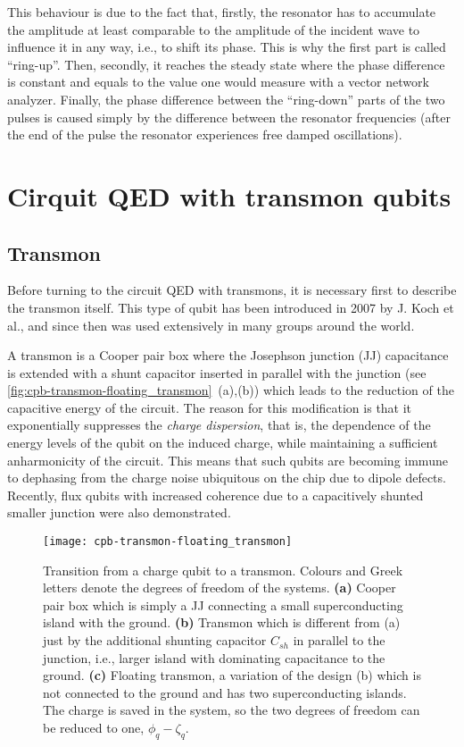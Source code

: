 This behaviour is due to the fact that, firstly, the resonator has to accumulate the amplitude at least comparable to the amplitude of the incident wave to influence it in any way, i.e., to shift its phase. This is why the first part is called ``ring-up''. Then, secondly, it reaches the steady state where the phase difference is constant and equals to the value one would measure with a vector network analyzer. Finally, the phase difference between the ``ring-down'' parts of the two pulses is caused simply by the difference between the resonator frequencies (after the end of the pulse the resonator experiences free damped oscillations).



\newpage

\section{Cirquit QED with transmon qubits}\label{sec:cQED}

\subsection{Transmon}

Before turning to the circuit QED with transmons, it is necessary first to describe the transmon itself. This type of qubit has been introduced\cite{Koch2007} in 2007 by J. Koch et al., and since then was used extensively in many groups around the world. 

A transmon is a Cooper pair box where the Josephson junction (JJ) capacitance is extended with a shunt capacitor inserted in parallel with the junction (see \autoref{fig:cpb-transmon-floating_transmon}~(a),(b)) which leads to the reduction of the capacitive energy of the circuit. The reason for this modification is that it exponentially suppresses the \textit{charge dispersion}, that is, the dependence of the energy levels of the qubit on the induced charge, while maintaining a sufficient anharmonicity of the circuit. This means that such qubits are becoming immune to dephasing from the charge noise ubiquitous on the chip due to dipole defects. Recently, flux qubits with increased coherence due to a capacitively shunted smaller junction were also demonstrated\cite{yan2015}.

\begin{figure}[h!]
\centering
\texttt{[image: cpb-transmon-floating\_transmon]}
\caption{Transition from a charge qubit to a transmon. Colours and Greek letters denote the degrees of freedom of the systems. \textbf{(a)} Cooper pair box which is simply a JJ connecting a small superconducting island with the ground. \textbf{(b)} Transmon which is different from (a) just by the additional shunting capacitor $C_{sh}$ in parallel to the junction, i.e., larger island with dominating capacitance to the ground. \textbf{(c)} Floating transmon, a variation of the design (b) which is not connected to the ground and has two superconducting islands. The charge is saved in the system, so the two degrees of freedom can be reduced to one, $\phi_q - \zeta_q$.}
\label{fig:cpb-transmon-floating_transmon}
\end{figure}

